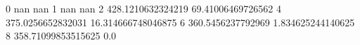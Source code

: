 0 nan nan
1 nan nan
2 428.1210632324219 69.41006469726562
4 375.0256652832031 16.314666748046875
6 360.5456237792969 1.834625244140625
8 358.71099853515625 0.0
